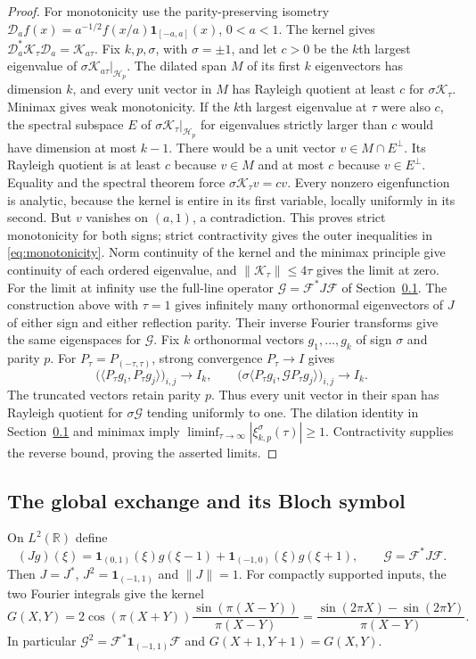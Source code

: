 \begin{proof}
For monotonicity use the parity-preserving isometry
$\mathcal D_af(x)=a^{-1/2}f(x/a)\mathbf1_{[-a,a]}(x)$, $0<a<1$.
The kernel gives
$\mathcal D_a^*\mathcal K_\tau\mathcal D_a=\mathcal K_{a\tau}$.
Fix $k,p,\sigma$, with $\sigma=\pm1$, and let $c>0$ be the $k$th
largest eigenvalue of $\sigma\mathcal K_{a\tau}|_{\mathcal H_p}$.
The dilated span $M$ of its first $k$ eigenvectors has dimension $k$,
and every unit vector in $M$ has Rayleigh quotient at least $c$ for
$\sigma\mathcal K_\tau$.  Minimax gives weak monotonicity.  If the
$k$th largest eigenvalue at $\tau$ were also $c$, the spectral subspace
$E$ of $\sigma\mathcal K_\tau|_{\mathcal H_p}$ for eigenvalues strictly
larger than $c$ would have dimension at most $k-1$.  There would be a
unit vector $v\in M\cap E^\perp$.  Its Rayleigh quotient is at least
$c$ because $v\in M$ and at most $c$ because $v\in E^\perp$.
Equality and the spectral theorem force
$\sigma\mathcal K_\tau v=cv$.  Every nonzero eigenfunction is analytic,
because the kernel is entire in its first variable, locally uniformly
in its second.  But $v$ vanishes on $(a,1)$, a contradiction.  This proves
strict monotonicity for both signs; strict contractivity gives the outer
inequalities in \eqref{eq:monotonicity}.
Norm continuity of the kernel and the minimax principle give continuity
of each ordered eigenvalue, and $\|\mathcal K_\tau\|\le4\tau$ gives
the limit at zero.  For the limit at infinity use the full-line operator
$\mathcal G=\mathcal F^*J\mathcal F$ of Section~\ref{sec:crosswindow}.
The construction above with $\tau=1$ gives infinitely many orthonormal
eigenvectors of $J$ of either sign and either reflection parity. Their
inverse Fourier transforms give the same eigenspaces for $\mathcal G$.
Fix $k$ orthonormal vectors $g_1,\ldots,g_k$ of sign $\sigma$ and parity $p$.
For $P_\tau=P_{(-\tau,\tau)}$, strong convergence $P_\tau\to I$ gives
\[
 \bigl(\langle P_\tau g_i,P_\tau g_j\rangle\bigr)_{i,j}\to I_k,
 \qquad
 \bigl(\sigma\langle P_\tau g_i,\mathcal G P_\tau g_j\rangle\bigr)_{i,j}
 \to I_k.
\]
The truncated vectors retain parity $p$. Thus every unit vector in their
span has Rayleigh quotient for $\sigma\mathcal G$ tending uniformly to one.
The dilation identity in Section~\ref{sec:crosswindow} and minimax imply
$\liminf_{\tau\to\infty}|\xi_{k,p}^{\sigma}(\tau)|\ge1$.
Contractivity supplies the reverse bound, proving the asserted limits.
\end{proof}

\subsection{The global exchange and its Bloch symbol}\label{sec:crosswindow}
On $L^2(\mathbb R)$ define
\[
 (Jg)(\xi)=\mathbf1_{(0,1)}(\xi)g(\xi-1)
              +\mathbf1_{(-1,0)}(\xi)g(\xi+1),\qquad
 \mathcal G=\mathcal F^*J\mathcal F.
\]
Then $J=J^*$, $J^2=\mathbf1_{(-1,1)}$ and $\|J\|=1$.
For compactly supported inputs, the two Fourier integrals give the kernel
\[
 G(X,Y)=2\cos(\pi(X+Y))\frac{\sin(\pi(X-Y))}{\pi(X-Y)}
       =\frac{\sin(2\pi X)-\sin(2\pi Y)}{\pi(X-Y)}.
\]
In particular $\mathcal G^2=\mathcal F^*\mathbf1_{(-1,1)}\mathcal F$
and $G(X+1,Y+1)=G(X,Y)$.

